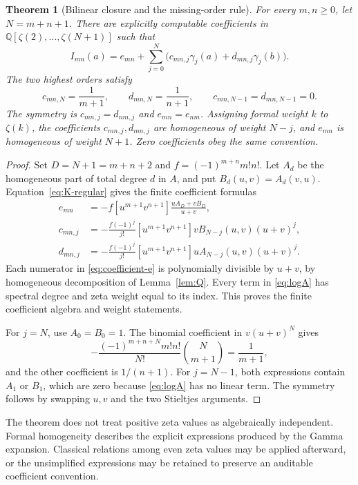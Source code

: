 \documentclass[11pt]{article}
\numberwithin{equation}{section}
\newtheorem{theorem}{Theorem}[section]
\theoremstyle{definition}
\theoremstyle{remark}
\newcommand{\Q}{\mathbb Q}
\newcommand{\coeff}[1]{\left[#1\right]}
\begin{document}
\begin{theorem}[Bilinear closure and the missing-order rule]
\label{thm:closure}
For every $m,n\ge0$, let $N=m+n+1$. There are explicitly computable
coefficients in $\Q[\zeta(2),\ldots,\zeta(N+1)]$ such that
\begin{equation}
 I_{mn}(a)=e_{mn}+\sum_{j=0}^{N}
       \bigl(c_{mn,j}\gamma_j(a)+d_{mn,j}\gamma_j(b)\bigr).
 \label{eq:closure-full}
\end{equation}
The two highest orders satisfy
\begin{equation}
 c_{mn,N}=\frac1{m+1},\qquad d_{mn,N}=\frac1{n+1},\qquad
 c_{mn,N-1}=d_{mn,N-1}=0.
 \label{eq:top-coefficients}
\end{equation}
The symmetry is $c_{mn,j}=d_{nm,j}$ and $e_{mn}=e_{nm}$.
Assigning formal weight $k$ to $\zeta(k)$, the coefficients
$c_{mn,j},d_{mn,j}$ are homogeneous of weight $N-j$, and $e_{mn}$ is
homogeneous of weight $N+1$. Zero coefficients obey the same convention.
\end{theorem}
\begin{proof}
Set $D=N+1=m+n+2$ and $f=(-1)^{m+n}m!n!$.
Let $A_d$ be the homogeneous part of total degree $d$ in $A$, and put
$B_d(u,v)=A_d(v,u)$. Equation~\eqref{eq:K-regular} gives the finite
coefficient formulas
\begin{align}
 e_{mn}&=-f\coeff{u^{m+1}v^{n+1}}
              \frac{uA_D+vB_D}{u+v},\label{eq:coefficient-e}\\
 c_{mn,j}&=-\frac{f(-1)^j}{j!}
       \coeff{u^{m+1}v^{n+1}}vB_{N-j}(u,v)(u+v)^j,\label{eq:coefficient-c}\\
 d_{mn,j}&=-\frac{f(-1)^j}{j!}
       \coeff{u^{m+1}v^{n+1}}uA_{N-j}(u,v)(u+v)^j.
       \label{eq:coefficient-d}
\end{align}
Each numerator in \eqref{eq:coefficient-e} is polynomially divisible by
$u+v$, by homogeneous decomposition of Lemma~\ref{lem:Q}.
Every term in \eqref{eq:logA} has spectral degree and zeta weight equal
to its index. This proves the finite coefficient algebra and weight
statements.

For $j=N$, use $A_0=B_0=1$. The binomial coefficient in
$v(u+v)^N$ gives
\[
 -\frac{(-1)^{m+n+N}m!n!}{N!}\binom{N}{m+1}
 =\frac1{m+1},
\]
and the other coefficient is $1/(n+1)$. For $j=N-1$, both expressions
contain $A_1$ or $B_1$, which are zero because \eqref{eq:logA} has no
linear term. The symmetry follows by swapping $u,v$ and the two
Stieltjes arguments.
\end{proof}

The theorem does not treat positive zeta values as algebraically
independent. Formal homogeneity describes the explicit expressions
produced by the Gamma expansion. Classical relations among even zeta
values may be applied afterward, or the unsimplified expressions may be
retained to preserve an auditable coefficient convention.
\end{document}
